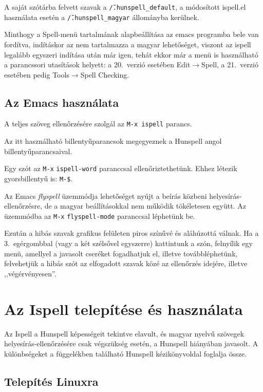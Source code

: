 A saját szótárba felvett szavak
a \texttt{\~/.hunspell\_default}, a módosított ispell.el használata esetén
a \texttt{\~/.hunspell\_magyar} állományba kerülnek.

Minthogy a Spell-menü tartalmának alapbeállítása az emacs programba
bele van fordítva, indításkor az nem tartalmazza a magyar lehetőséget,
viszont az ispell legalább egyszeri indítása után már igen, tehát
ekkor már a menü is használható a parancssori utasítások helyett: a
20.\ verzió esetében Edit$\rightarrow$Spell, a 21.\ verzió esetében
pedig Tools$\rightarrow$Spell Checking.

\subsection{Az Emacs használata}

A teljes szöveg ellenőrzésére szolgál az \texttt{M-x ispell} parancs.

Az itt használható billentyűparancsok
megegyeznek a Hunspell angol billentyűparancsaival.

Egy szót az \texttt{M-x} \texttt{ispell-word} paranccsal 
ellenőriztethetünk. Ehhez létezik gyorsbillentyű is: \texttt{M-\$}.

Az Emacs \emph{flyspell} üzemmódja lehetőséget nyújt a beírás
közbeni helyesírás-ellenőrzésre, de a magyar beállításokkal
nem működik tökéletesen együtt. Az üzemmódba az
\texttt{M-x} \texttt{flyspell-mode} paranccsal léphetünk be.

Ezután a hibás szavak grafikus felületen
piros színűvé és aláhúzottá válnak. Ha a 3.\ egérgombbal (vagy a
két szélsővel egyszerre) kattintunk a szón, felnyílik egy
menü, amellyel a javasolt cseréket fogadhatjuk el, illetve továbbléphetünk,
felvehetjük a hibás szót az elfogadott szavak közé az ellenőrzés idejére,
illetve ,,végérvényesen''.


\section{Az Ispell telepítése és használata}

Az Ispell a Hunspell képességeit tekintve elavult, és
magyar nyelvű szövegek helyesírás-ellenőrzésére csak
végszükség esetén, a Hunspell hiányában javasolt. A különbségeket a
függelékben található Hunspell kézikönyvoldal foglalja
össze.

\subsection{Telepítés Linuxra}

